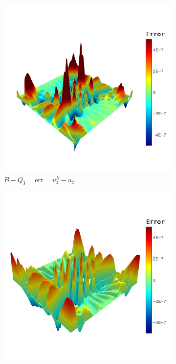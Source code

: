\begin{figure}[h]
	\center
	\captionsetup[subfigure]{labelformat=empty}
	\begin{subfigure}[t]{.45\linewidth}
		\center
		\includegraphics[scale=.3,trim={0cm 1.5cm 0cm 1.5cm},clip]{e_d}
		\caption{$B-Q_3$ $\quad \text{err} = u_z^h-u_z$}
	\end{subfigure}
	\begin{subfigure}[t]{.45\linewidth}
		\center
		\includegraphics[scale=.3,trim={0cm 1.5cm 0cm 1.5cm},clip]{g_d}

\end{subfigure}
\end{figure}

